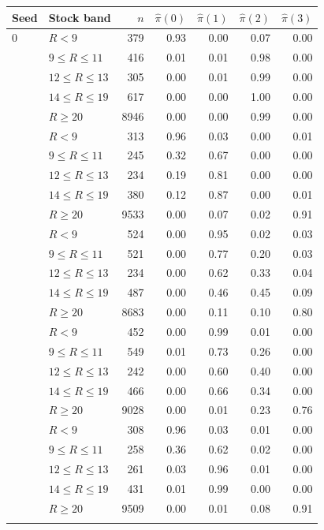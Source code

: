 \begin{tabular}{llrrrrr}
\toprule
Seed & Stock band & $n$ & $\hat\pi(0)$ & $\hat\pi(1)$ & $\hat\pi(2)$ & $\hat\pi(3)$ \\
\midrule
0 & $R<9$ & 379 & 0.93 & 0.00 & 0.07 & 0.00 \\
 & $9\le R\le 11$ & 416 & 0.01 & 0.01 & 0.98 & 0.00 \\
 & $12\le R\le 13$ & 305 & 0.00 & 0.01 & 0.99 & 0.00 \\
 & $14\le R\le 19$ & 617 & 0.00 & 0.00 & 1.00 & 0.00 \\
 & $R\ge 20$ & 8946 & 0.00 & 0.00 & 0.99 & 0.00 \\
\addlinespace
1 & $R<9$ & 313 & 0.96 & 0.03 & 0.00 & 0.01 \\
 & $9\le R\le 11$ & 245 & 0.32 & 0.67 & 0.00 & 0.00 \\
 & $12\le R\le 13$ & 234 & 0.19 & 0.81 & 0.00 & 0.00 \\
 & $14\le R\le 19$ & 380 & 0.12 & 0.87 & 0.00 & 0.01 \\
 & $R\ge 20$ & 9533 & 0.00 & 0.07 & 0.02 & 0.91 \\
\addlinespace
2 & $R<9$ & 524 & 0.00 & 0.95 & 0.02 & 0.03 \\
 & $9\le R\le 11$ & 521 & 0.00 & 0.77 & 0.20 & 0.03 \\
 & $12\le R\le 13$ & 234 & 0.00 & 0.62 & 0.33 & 0.04 \\
 & $14\le R\le 19$ & 487 & 0.00 & 0.46 & 0.45 & 0.09 \\
 & $R\ge 20$ & 8683 & 0.00 & 0.11 & 0.10 & 0.80 \\
\addlinespace
3 & $R<9$ & 452 & 0.00 & 0.99 & 0.01 & 0.00 \\
 & $9\le R\le 11$ & 549 & 0.01 & 0.73 & 0.26 & 0.00 \\
 & $12\le R\le 13$ & 242 & 0.00 & 0.60 & 0.40 & 0.00 \\
 & $14\le R\le 19$ & 466 & 0.00 & 0.66 & 0.34 & 0.00 \\
 & $R\ge 20$ & 9028 & 0.00 & 0.01 & 0.23 & 0.76 \\
\addlinespace
4 & $R<9$ & 308 & 0.96 & 0.03 & 0.01 & 0.00 \\
 & $9\le R\le 11$ & 258 & 0.36 & 0.62 & 0.02 & 0.00 \\
 & $12\le R\le 13$ & 261 & 0.03 & 0.96 & 0.01 & 0.00 \\
 & $14\le R\le 19$ & 431 & 0.01 & 0.99 & 0.00 & 0.00 \\
 & $R\ge 20$ & 9509 & 0.00 & 0.01 & 0.08 & 0.91 \\
\addlinespace
\bottomrule
\end{tabular}
